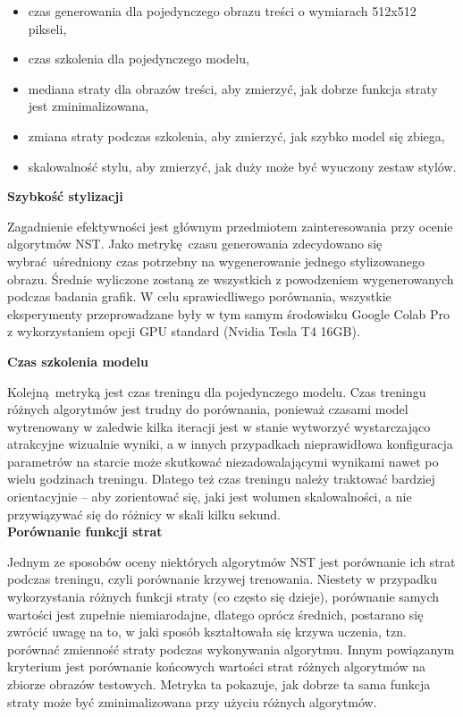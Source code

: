 \documentclass[12pt]{article}
\begin{document}
\begin{itemize}
    \item czas generowania dla pojedynczego obrazu treści o wymiarach 512x512 pikseli,
    \item czas szkolenia dla pojedynczego modelu,
    \item mediana straty dla obrazów treści, aby zmierzyć, jak dobrze funkcja straty jest zminimalizowana,
    \item zmiana straty podczas szkolenia, aby zmierzyć, jak szybko model się zbiega,
    \item skalowalność stylu, aby zmierzyć, jak duży może być wyuczony zestaw stylów.
\end{itemize}

\noindent\textbf{Szybkość stylizacji}

Zagadnienie efektywności jest głównym przedmiotem zainteresowania przy ocenie algorytmów NST. Jako metrykę czasu generowania zdecydowano się wybrać uśredniony czas potrzebny na wygenerowanie jednego stylizowanego obrazu. Średnie wyliczone zostaną ze wszystkich z powodzeniem wygenerowanych podczas badania grafik. W celu sprawiedliwego porównania, wszystkie eksperymenty przeprowadzane były w tym samym środowisku Google Colab Pro z wykorzystaniem opcji GPU standard (Nvidia Tesla T4 16GB).

\noindent\textbf{Czas szkolenia modelu}

Kolejną metryką jest czas treningu dla pojedynczego modelu. Czas treningu różnych algorytmów jest trudny do porównania, ponieważ czasami model wytrenowany w zaledwie kilka iteracji jest w stanie wytworzyć wystarczająco atrakcyjne wizualnie wyniki, a w innych przypadkach nieprawidłowa konfiguracja parametrów na starcie może skutkować niezadowalającymi wynikami nawet po wielu godzinach treningu. Dlatego też czas treningu należy traktować bardziej orientacyjnie – aby zorientować się, jaki jest wolumen skalowalności, a nie przywiązywać się do różnicy w skali kilku sekund.\\

\noindent\textbf{Porównanie funkcji strat}

Jednym ze sposobów oceny niektórych algorytmów NST jest porównanie ich strat podczas treningu, czyli porównanie krzywej trenowania. Niestety w przypadku wykorzystania różnych funkcji straty (co często się dzieje), porównanie samych wartości jest zupełnie niemiarodajne, dlatego oprócz średnich, postarano się zwrócić uwagę na to, w jaki sposób kształtowała się krzywa uczenia, tzn. porównać zmienność straty podczas wykonywania algorytmu. Innym powiązanym kryterium jest porównanie końcowych wartości strat różnych algorytmów na zbiorze obrazów testowych. Metryka ta pokazuje, jak dobrze ta sama funkcja straty może być zminimalizowana przy użyciu różnych algorytmów.
\end{document}
